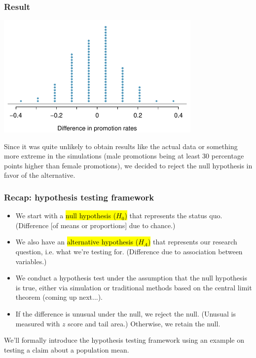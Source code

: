 \begin{frame}
\frametitle{Result}

\begin{center}
\includegraphics[width=0.75\textwidth]{4-3_hyp_test/figures/discRandDotPlot/discRandDotPlot}
\end{center}

\pause

Since it was quite unlikely to obtain results like the actual data or something more extreme in the simulations (male promotions being at least 30 percentage points higher than female promotions), we decided to reject the null hypothesis in favor of the alternative.

\end{frame}


\begin{frame}
\frametitle{Recap: hypothesis testing framework}

\begin{itemize}
\item We start with a \hl{null hypothesis ($H_0$)} that represents the status quo. (Difference [of means or proportions] due to chance.)
\pause
\item We also have an \hl{alternative hypothesis ($H_A$)} that represents our research question, i.e. what we're testing for. (Difference due to association between variables.)
\pause
\item We conduct a hypothesis test under the assumption that the null hypothesis is true, either via simulation or traditional methods based on the central limit theorem (coming up next...).
\pause
\item If the difference is unusual under the null, we reject the null. (Unusual is measured with $z$ score and tail area.) Otherwise, we retain the null.
\end{itemize}
\pause
We'll formally introduce the hypothesis testing framework using an example on testing a claim about a population mean.

\end{frame}

